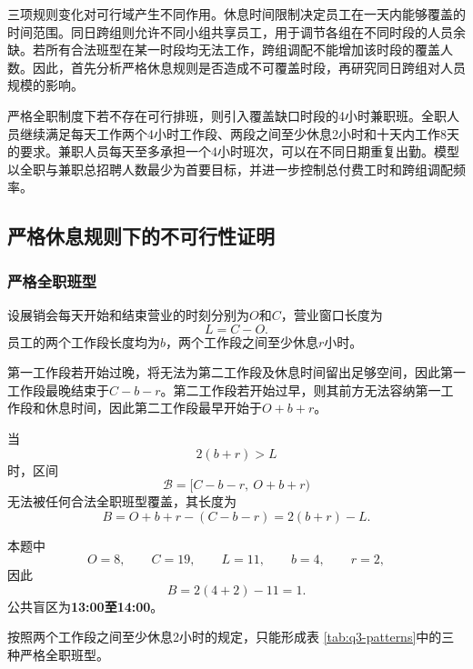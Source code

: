 \documentclass[withoutpreface,bwprint]{cumcmthesis}
\begin{document}
三项规则变化对可行域产生不同作用。休息时间限制决定员工在一天内能够覆盖的时间范围。同日跨组则允许不同小组共享员工，用于调节各组在不同时段的人员余缺。若所有合法班型在某一时段均无法工作，跨组调配不能增加该时段的覆盖人数。因此，首先分析严格休息规则是否造成不可覆盖时段，再研究同日跨组对人员规模的影响。

严格全职制度下若不存在可行排班，则引入覆盖缺口时段的4小时兼职班。全职人员继续满足每天工作两个4小时工作段、两段之间至少休息2小时和十天内工作8天的要求。兼职人员每天至多承担一个4小时班次，可以在不同日期重复出勤。模型以全职与兼职总招聘人数最少为首要目标，并进一步控制总付费工时和跨组调配频率。

\subsection{严格休息规则下的不可行性证明}

\subsubsection{严格全职班型}

设展销会每天开始和结束营业的时刻分别为$O$和$C$，营业窗口长度为
\[
L=C-O.
\]
员工的两个工作段长度均为$b$，两个工作段之间至少休息$r$小时。

第一工作段若开始过晚，将无法为第二工作段及休息时间留出足够空间，因此第一工作段最晚结束于$C-b-r$。第二工作段若开始过早，则其前方无法容纳第一工作段和休息时间，因此第二工作段最早开始于$O+b+r$。

当
\begin{equation}
2(b+r)>L
\label{eq:q3-blind-condition}
\end{equation}
时，区间
\begin{equation}
\mathcal B=
[C-b-r,\ O+b+r)
\label{eq:q3-blind-interval}
\end{equation}
无法被任何合法全职班型覆盖，其长度为
\begin{equation}
B
=
O+b+r-(C-b-r)
=
2(b+r)-L.
\label{eq:q3-blind-length}
\end{equation}

本题中
\[
O=8,\qquad C=19,\qquad L=11,\qquad b=4,\qquad r=2,
\]
因此
\[
B=2(4+2)-11=1.
\]
公共盲区为\textbf{13:00至14:00}。

按照两个工作段之间至少休息2小时的规定，只能形成表
\ref{tab:q3-patterns}中的三种严格全职班型。
\end{document}
